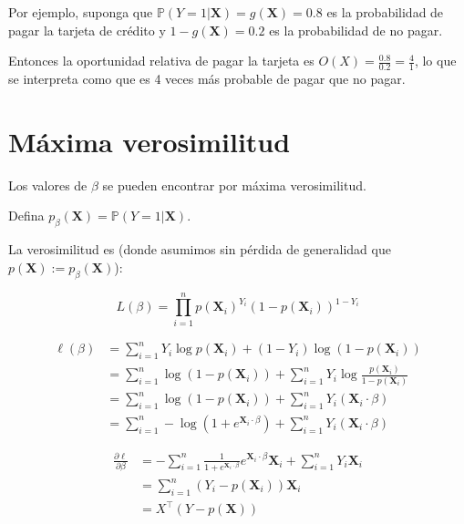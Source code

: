 \documentclass[
  12pt,
]{book}
\begin{document}
Por ejemplo, suponga que
\(\mathbb{P}\left(Y=1\vert \boldsymbol{X}\right) = g(\boldsymbol{X}) = 0.8\)
es la probabilidad de pagar la tarjeta de crédito y
\(1-g(\boldsymbol{X}) = 0.2\) es la probabilidad de no pagar.

Entonces la oportunidad relativa de pagar la tarjeta es
\(O(X) = \frac{0.8}{0.2} = \frac{4}{1}\), lo que se interpreta como que
es 4 veces más probable de pagar que no pagar.

\hypertarget{muxe1xima-verosimilitud}{%
\section{Máxima verosimilitud}\label{muxe1xima-verosimilitud}}

Los valores de \(\beta\) se pueden encontrar por máxima verosimilitud.

Defina
\(p_{\beta}(\boldsymbol{X}) = \mathbb{P}\left(Y=1\vert \boldsymbol{X}\right)\).

La verosimilitud es (donde asumimos sin pérdida de generalidad que
\(p(\boldsymbol{X}):=p_{\beta}(\boldsymbol{X})\)):

\[
L\left(\beta\right)=\prod_{i=1}^{n} p\left(\boldsymbol{X}_{i}\right)^{Y_{i}}\left(1-p\left(\boldsymbol{X}_{i}\right)\right)^{1-Y_{i}}
\]

\begin{align*}
\ell\left(\beta\right) 
&=\sum_{i=1}^{n} Y_{i} \log p\left(\boldsymbol{X}_{i}\right)+\left(1-Y_{i}\right) \log \left(1-p\left(\boldsymbol{X}_{i}\right)\right) \\
&=\sum_{i=1}^{n} \log \left(1-p\left(\boldsymbol{X}_{i}\right)\right)+\sum_{i=1}^{n} Y_{i} \log \frac{p\left(\boldsymbol{X}_{i}\right)}{1-p\left(\boldsymbol{X}_{i}\right)} \\
&=\sum_{i=1}^{n} \log \left(1-p\left(\boldsymbol{X}_{i}\right)\right)+\sum_{i=1}^{n} Y_{i}\left(\boldsymbol{X}_{i} \cdot \beta\right) \\
&=\sum_{i=1}^{n}-\log \left(1+e^{\boldsymbol{X}_{i} \cdot \beta}\right)+\sum_{i=1}^{n} Y_{i}\left(\boldsymbol{X}_{i} \cdot \beta\right)
\end{align*}

\begin{align*}
\frac{\partial \ell}{\partial \beta} 
&=-\sum_{i=1}^{n} \frac{1}{1+e^{\boldsymbol{X}_{i} \cdot \beta}} e^{\boldsymbol{X}_{i} \cdot \beta} \boldsymbol{X}_{i}+\sum_{i=1}^{n} Y_{i} \boldsymbol{X}_{i} \\
&=\sum_{i=1}^{n}\left(Y_{i}-p\left(\boldsymbol{X}_{i}\right)\right) \boldsymbol{X}_{i} \\
&= X^{\top}(Y-p(\boldsymbol{X}))
\end{align*}
\end{document}
